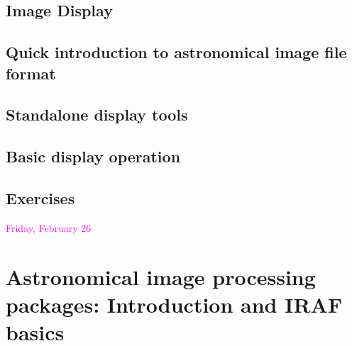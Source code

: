 \documentclass{article}
\begin{document}
\subsection*{Image Display}
\subsection*{Quick introduction to astronomical image file format}
\subsection*{Standalone display tools}
\subsection*{Basic display operation}
\subsection*{Exercises}


\textcolor{magenta}{Friday, February 26}

\section*{Astronomical image processing packages: Introduction and
IRAF basics}
\end{document}
